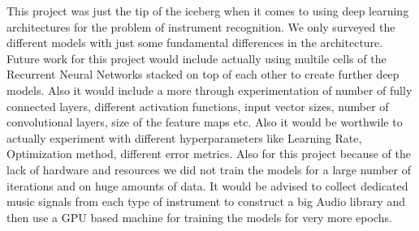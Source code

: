 \documentclass[letterpaper, 12 pt, conference]{ieeeconf}  %
\begin{document}
This project was just the tip of the iceberg when it comes to using deep learning architectures for the problem of instrument recognition. We only surveyed the different models with just some fundamental differences in the architecture. Future work for this project would include actually using multile cells of the Recurrent Neural Networks stacked on top of each other to create further deep models. Also it would include a more through experimentation of number of fully connected layers, different activation functions, input vector sizes, number of convolutional layers, size of the feature maps etc. Also it would be worthwile to actually experiment with different hyperparameters like Learning Rate, Optimization method, different error metrics. Also for this project because of the lack of hardware and resources we did not train the models for a large number of iterations and on huge amounts of data. It would be advised to collect dedicated music signals from each type of instrument to construct a big Audio library and then use a GPU based machine for training the models for very more epochs.
\end{document}
